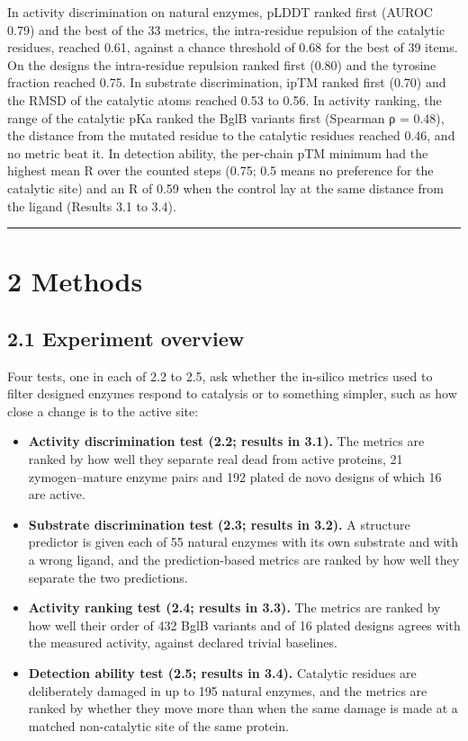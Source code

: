 \documentclass[
  10pt,
]{article}
\providecommand{\tightlist}{%
  \setlength{\itemsep}{0pt}\setlength{\parskip}{0pt}}
\DeclareRobustCommand{\_}{\textunderscore\hspace{0pt}}
\begin{document}
In activity
discrimination on
natural enzymes,
pLDDT ranked first
(AUROC 0.79) and the
best of the 33
metrics, the
intra-residue
repulsion of the
catalytic residues,
reached 0.61,
against a chance
threshold of 0.68
for the best of 39
items. On the
designs the
intra-residue
repulsion ranked
first (0.80) and the
tyrosine fraction
reached 0.75. In
substrate
discrimination, ipTM
ranked first (0.70)
and the RMSD of the
catalytic atoms
reached 0.53 to
0.56. In activity
ranking, the range
of the catalytic pKa
ranked the BglB
variants first
(Spearman ρ = 0.48),
the distance from
the mutated residue
to the catalytic
residues reached
0.46, and no metric
beat it. In
detection ability,
the per-chain pTM
minimum had the
highest mean R over
the counted steps
(0.75; 0.5 means no
preference for the
catalytic site) and
an R of 0.59 when
the control lay at
the same distance
from the ligand
(Results 3.1 to
3.4).

\begin{center}\rule{0.5\linewidth}{0.5pt}\end{center}

\section{2 Methods}

\subsection{2.1
Experiment overview}

Four tests, one in
each of 2.2 to 2.5,
ask whether the
in-silico metrics
used to filter
designed enzymes
respond to catalysis
or to something
simpler, such as how
close a change is to
the active site:

\begin{itemize}
\tightlist
\item
  \textbf{Activity
  discrimination
  test (2.2; results
  in 3.1).} The
  metrics are ranked
  by how well they
  separate real dead
  from active
  proteins, 21
  zymogen--mature
  enzyme pairs and
  192 plated de novo
  designs of which
  16 are active.
\item
  \textbf{Substrate
  discrimination
  test (2.3; results
  in 3.2).} A
  structure
  predictor is given
  each of 55 natural
  enzymes with its
  own substrate and
  with a wrong
  ligand, and the
  prediction-based
  metrics are ranked
  by how well they
  separate the two
  predictions.
\item
  \textbf{Activity
  ranking test (2.4;
  results in 3.3).}
  The metrics are
  ranked by how well
  their order of 432
  BglB variants and
  of 16 plated
  designs agrees
  with the measured
  activity, against
  declared trivial
  baselines.
\item
  \textbf{Detection
  ability test (2.5;
  results in 3.4).}
  Catalytic residues
  are deliberately
  damaged in up to
  195 natural
  enzymes, and the
  metrics are ranked
  by whether they
  move more than
  when the same
  damage is made at
  a matched
  non-catalytic site
  of the same
  protein.
\end{itemize}
\end{document}
